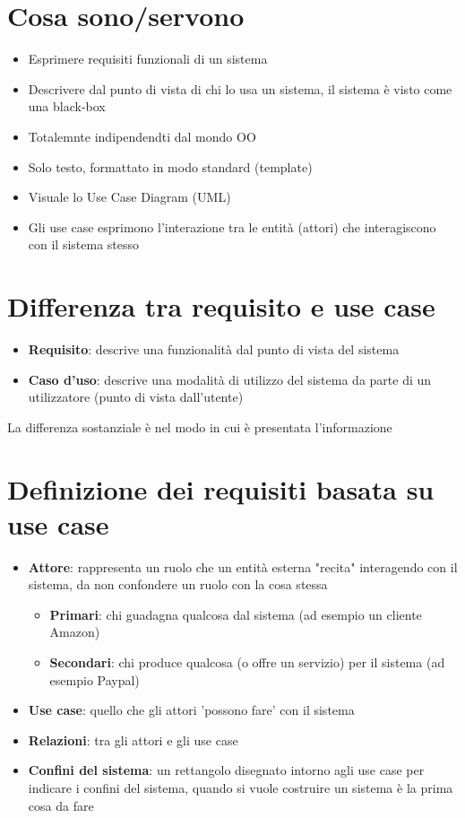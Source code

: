 \documentclass[12pt, a4paper]{report}
\begin{document}
\section{Cosa sono/servono}
\begin{itemize}
    \item Esprimere requisiti funzionali di un sistema
    \item Descrivere dal punto di vista di chi lo usa un sistema, il sistema è visto come una black-box
    \item Totalemnte indipendendti dal mondo OO
    \item Solo testo, formattato in modo standard (template)
    \item Visuale lo Use Case Diagram (UML)
    \item Gli use case esprimono l'interazione tra le entità (attori) che interagiscono con il sistema stesso
\end{itemize}
\section{Differenza tra requisito e use case}
\begin{itemize}
    \item \textbf{Requisito}: descrive una funzionalità dal punto di vista del sistema
    \item \textbf{Caso d'uso}: descrive una modalità di utilizzo del sistema da parte di un utilizzatore (punto di vista dall'utente)
\end{itemize}
La differenza sostanziale è nel modo in cui è presentata l'informazione
\section{Definizione dei requisiti basata su use case}
\begin{itemize}
    \item \textbf{Attore}: rappresenta un ruolo che un entità esterna "recita" interagendo con il sistema, da non confondere un ruolo con la cosa stessa \begin{itemize}
        \item \textbf{Primari}: chi guadagna qualcosa dal sistema (ad esempio un cliente Amazon)
        \item \textbf{Secondari}: chi produce qualcosa (o offre un servizio) per il sistema (ad esempio Paypal)
    \end{itemize}
    \item \textbf{Use case}: quello che gli attori 'possono fare' con il sistema
    \item \textbf{Relazioni}: tra gli attori e gli use case
    \item \textbf{Confini del sistema}: un rettangolo disegnato intorno agli use case per indicare i confini del sistema, quando si vuole costruire un sistema è la prima cosa da fare
\end{itemize}
\end{document}
